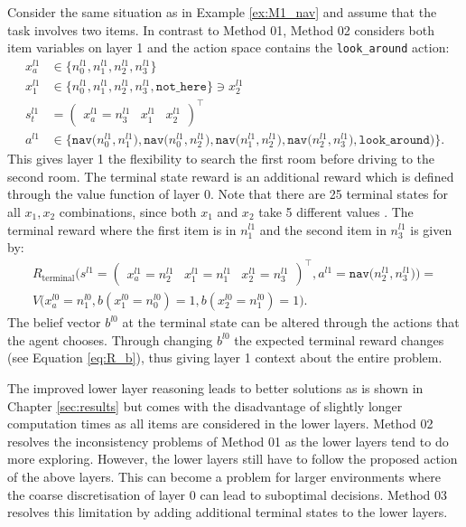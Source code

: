 \begin{example}\label{ex:M2_nav}
Consider the same situation as in Example \ref{ex:M1_nav} and assume that the task involves two items. In contrast to Method 01, Method 02 considers both item variables on layer 1 and the action space contains the \texttt{look\_around} action:
\begin{equation}
    \begin{aligned}
         x_a^{l1} &\in \big\{n_0^{l1}, n_1^{l1}, n_2^{l1}, n_3^{l1}  \big\} \\
         x_1^{l1} &\in \big\{n_0^{l1}, n_1^{l1}, n_2^{l1}, n_3^{l1}, \texttt{not\_here} \big\} \ni x_2^{l1}\\
        s_t^{l1} &= \begin{pmatrix}x_a^{l1}=n_3^{l1} & x_1^{l1} & x_2^{l1} \end{pmatrix}^\intercal\\
        a^{l1} &\in \big\{\texttt{nav($n_0^{l1}, n_1^{l1}$)}, \texttt{nav($n_0^{l1}, n_2^{l1}$)}, \texttt{nav($n_1^{l1}, n_2^{l1}$)},\texttt{nav($n_2^{l1}, n_3^{l1}$)}, \texttt{look\_around)} \big\}.
    \end{aligned}
\end{equation}
This gives layer 1 the flexibility to search the first room before driving to the second room. The terminal state reward is an additional reward which is defined through the value function of layer 0. Note that there are 25 terminal states for all $x_1, x_2$ combinations, since both $x_1$ and $x_2$ take 5 different values . The terminal reward where the first item is in $n_1^{l1}$ and the second item in $n_3^{l1}$ is given by:  
\begin{multline}
    R_\text{terminal}\big(s^{l1}=\begin{pmatrix} x_a^{l1}=n_2^{l1} & x_1^{l1} = n_1^{l1} & x_2^{l1} = n_3^{l1} \end{pmatrix}^\intercal, a^{l1}=\texttt{nav($n_2^{l1},n_3^{l1}$)}\big)=\\
    V\big( x_a^{l0}=n_1^{l0}, b(x_1^{l0}=n_0^{l0})=1, b(x_2^{l0}=n_1^{l0})=1 \big).
\end{multline}
The belief vector $b^{l0}$ at the terminal state can be altered through the actions that the agent chooses. Through changing $b^{l0}$ the expected terminal reward changes (see Equation \ref{eq:R_b}), thus giving layer 1 context about the entire problem. 
\demo
\end{example}
The improved lower layer reasoning leads to better solutions as is shown in Chapter \ref{sec:results} but comes with the disadvantage of slightly longer computation times as all items are considered in the lower layers. Method 02 resolves the inconsistency problems of Method 01 as the lower layers tend to do more exploring. However, the lower layers still have to follow the proposed action of the above layers. This can become a problem for larger environments where the coarse discretisation of layer 0 can lead to suboptimal decisions. Method 03 resolves this limitation by adding additional terminal states to the lower layers.

